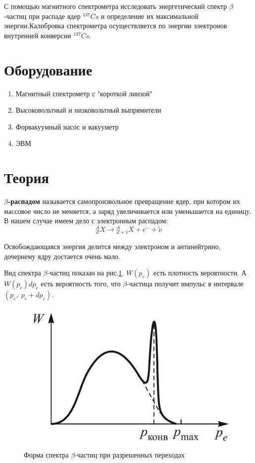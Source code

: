 \documentclass[a4paper]{article}
\begin{document}
С помощью магнитного спектрометра исследовать энергетический спектр $\beta$-частиц при распаде
ядер $^{137}Cs$ и определение их максимальной энергии.Калибровка спектрометра осуществляется
по энергии электронов внутренней конверсии $^{137}Cs$.

\section{Оборудование}
\begin{enumerate}
    \item Магнитный спектрометр с "короткой линзой"
    \item Высоковольтный и низковольтный выпрямители
    \item Форвакуумный насос и вакууметр
    \item ЭВМ
\end{enumerate}


\section{Теория}

\textbf{$\beta$-распадом} называется самопроизвольное превращение ядер, при котором их массовое
число не меняется, а заряд увеличивается или уменьшается на единицу. В нашем случае имеем дело 
с электронным распадом:
$${_Z^A}X \rightarrow {_{Z+1}^A}X + e^- + \tilde{\nu}$$

Освобождающаяся энергия делится между электроном и антинейтрино, дочернему ядру достается очень
мало.

Вид спектра $\beta$-частиц показан на рис.\ref{p1}. $W(p_e)$ есть плотность вероятности. А 
$W(p_e)dp_e$ есть вероятность того, что $\beta$-частица получит импульс в интервале $(p_e, \; p_e+dp_e)$.

\begin{figure}
    \includegraphics[scale = 0.2]{p1.png}
    \caption{Форма спектра $\beta$-частиц при разрешенных переходах}
    \label{p1}
\end{figure}
\end{document}
